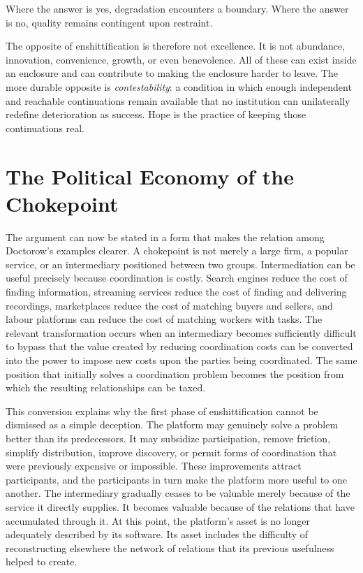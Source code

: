 \documentclass[11pt]{article}
\begin{document}
Where the answer is yes, degradation encounters a boundary. Where the answer is no, quality remains contingent upon restraint.

The opposite of enshittification is therefore not excellence. It is not abundance, innovation, convenience, growth, or even benevolence. All of these can exist inside an enclosure and can contribute to making the enclosure harder to leave. The more durable opposite is \emph{contestability}: a condition in which enough independent and reachable continuations remain available that no institution can unilaterally redefine deterioration as success. Hope is the practice of keeping those continuations real.

\section{The Political Economy of the Chokepoint}

The argument can now be stated in a form that makes the relation among Doctorow's examples clearer. A chokepoint is not merely a large firm, a popular service, or an intermediary positioned between two groups. Intermediation can be useful precisely because coordination is costly. Search engines reduce the cost of finding information, streaming services reduce the cost of finding and delivering recordings, marketplaces reduce the cost of matching buyers and sellers, and labour platforms can reduce the cost of matching workers with tasks. The relevant transformation occurs when an intermediary becomes sufficiently difficult to bypass that the value created by reducing coordination costs can be converted into the power to impose new costs upon the parties being coordinated. The same position that initially solves a coordination problem becomes the position from which the resulting relationships can be taxed.

This conversion explains why the first phase of enshittification cannot be dismissed as a simple deception. The platform may genuinely solve a problem better than its predecessors. It may subsidize participation, remove friction, simplify distribution, improve discovery, or permit forms of coordination that were previously expensive or impossible. These improvements attract participants, and the participants in turn make the platform more useful to one another. The intermediary gradually ceases to be valuable merely because of the service it directly supplies. It becomes valuable because of the relations that have accumulated through it. At this point, the platform's asset is no longer adequately described by its software. Its asset includes the difficulty of reconstructing elsewhere the network of relations that its previous usefulness helped to create.
\end{document}
